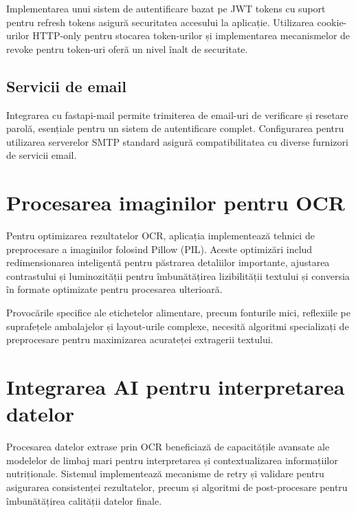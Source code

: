 Implementarea unui sistem de autentificare bazat pe JWT tokens cu suport pentru refresh tokens asigură securitatea accesului la aplicație. Utilizarea cookie-urilor HTTP-only pentru stocarea token-urilor și implementarea mecanismelor de revoke pentru token-uri oferă un nivel înalt de securitate.

\subsection{Servicii de email}

Integrarea cu fastapi-mail permite trimiterea de email-uri de verificare și resetare parolă, esențiale pentru un sistem de autentificare complet. Configurarea pentru utilizarea serverelor SMTP standard asigură compatibilitatea cu diverse furnizori de servicii email.

\section{Procesarea imaginilor pentru OCR}

Pentru optimizarea rezultatelor OCR, aplicația implementează tehnici de preprocesare a imaginilor folosind Pillow (PIL). Aceste optimizări includ redimensionarea inteligentă pentru păstrarea detaliilor importante, ajustarea contrastului și luminozității pentru îmbunătățirea lizibilității textului și conversia în formate optimizate pentru procesarea ulterioară.

Provocările specifice ale etichetelor alimentare, precum fonturile mici, reflexiile pe suprafețele ambalajelor și layout-urile complexe, necesită algoritmi specializați de preprocesare pentru maximizarea acurateței extragerii textului.

\section{Integrarea AI pentru interpretarea datelor}

Procesarea datelor extrase prin OCR beneficiază de capacitățile avansate ale modelelor de limbaj mari pentru interpretarea și contextualizarea informațiilor nutriționale. Sistemul implementează mecanisme de retry și validare pentru asigurarea consistenței rezultatelor, precum și algoritmi de post-procesare pentru îmbunătățirea calității datelor finale.
